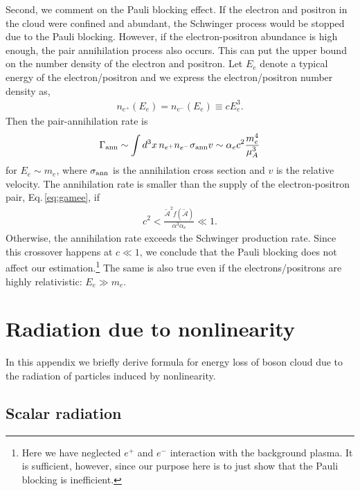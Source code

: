 \documentclass[%
 preprint,
 nofootinbib,
 amsmath,amssymb,
 aps,
 a4paper
]{revtex4-1}
\begin{document}
Second, we comment on the Pauli blocking effect. If the electron and positron in the cloud were confined and abundant, the Schwinger process would be stopped due to the Pauli blocking. However, if the electron-positron abundance is high enough, the pair annihilation process also occurs. This can put the upper bound on the number density of the electron and positron. Let $E_e$ denote a typical energy of the electron/positron and we express the electron/positron number density as,
\begin{align}
    n_{e^+}(E_e) = n_{e^-}(E_e) \equiv c E_e^3.
\end{align}
Then the pair-annihilation rate is
\begin{align}
\Gamma_\text{ann} \sim \int d^3x\,n_{e^+}n_{e^-} \sigma_{\rm ann} v \sim \alpha_e c^2 \frac{m_e^4}{\mu_A^3}
\end{align}
for $E_e \sim m_e$, where $\sigma_{\rm ann}$ is the annihilation cross section and $v$ is the relative velocity. The annihilation rate is smaller than the supply of the electron-positron pair, Eq.\,\eqref{eq:gamee}, if
\begin{align}
    c^2 < \frac{\widetilde{\mathcal A}^2 f(\widetilde{\mathcal{A}})}{\alpha^3\alpha_e}
    \ll 1.
\end{align}
Otherwise, the annihilation rate exceeds the Schwinger production rate. Since this crossover happens at $c\ll 1$, we conclude that the Pauli blocking does not affect our estimation.\footnote{
    Here we have neglected $e^+$ and $e^-$ interaction with the background plasma. It is sufficient, however, since our purpose here is to just show that the Pauli blocking is inefficient. 
} The same is also true even if the electrons/positrons are highly relativistic: $E_e\gg m_e$.


\section{Radiation due to nonlinearity}  \label{sec:rad}


In this appendix we briefly derive formula for energy loss of boson cloud due to the radiation of particles induced by nonlinearity.


\subsection{Scalar radiation}  
\end{document}
